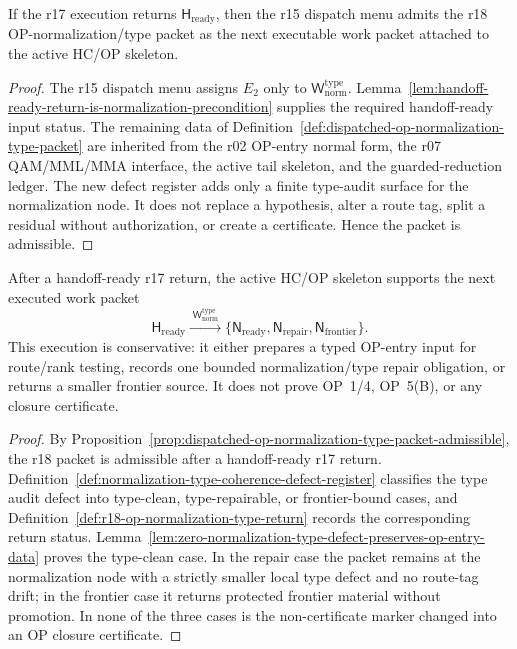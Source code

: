 \begin{proposition}
\label{prop:dispatched-op-normalization-type-packet-admissible}
If the r17 execution returns \(\mathsf H_{\mathrm{ready}}\), then the r15 dispatch menu admits the r18 OP-normalization/type packet as the next executable work packet attached to the active HC/OP skeleton.
\end{proposition}

\begin{proof}
The r15 dispatch menu assigns \(E_2\) only to \(\mathsf W_{\mathrm{norm}}^{\mathrm{type}}\).  Lemma~\ref{lem:handoff-ready-return-is-normalization-precondition} supplies the required handoff-ready input status.  The remaining data of Definition~\ref{def:dispatched-op-normalization-type-packet} are inherited from the r02 OP-entry normal form, the r07 QAM/MML/MMA interface, the active tail skeleton, and the guarded-reduction ledger.  The new defect register adds only a finite type-audit surface for the normalization node.  It does not replace a hypothesis, alter a route tag, split a residual without authorization, or create a certificate.  Hence the packet is admissible.
\end{proof}

\begin{theorem}
\label{thm:first-dispatched-op-normalization-type-packet}
After a handoff-ready r17 return, the active HC/OP skeleton supports the next executed work packet
\[
  \mathsf H_{\mathrm{ready}}
  \xrightarrow{\;\mathsf W_{\mathrm{norm}}^{\mathrm{type}}\;}
  \{\mathsf N_{\mathrm{ready}},\mathsf N_{\mathrm{repair}},\mathsf N_{\mathrm{frontier}}\}.
\]
This execution is conservative: it either prepares a typed OP-entry input for route/rank testing, records one bounded normalization/type repair obligation, or returns a smaller frontier source.  It does not prove OP~1/4, OP~5(B), or any closure certificate.
\end{theorem}

\begin{proof}
By Proposition~\ref{prop:dispatched-op-normalization-type-packet-admissible}, the r18 packet is admissible after a handoff-ready r17 return.  Definition~\ref{def:normalization-type-coherence-defect-register} classifies the type audit defect into type-clean, type-repairable, or frontier-bound cases, and Definition~\ref{def:r18-op-normalization-type-return} records the corresponding return status.  Lemma~\ref{lem:zero-normalization-type-defect-preserves-op-entry-data} proves the type-clean case.  In the repair case the packet remains at the normalization node with a strictly smaller local type defect and no route-tag drift; in the frontier case it returns protected frontier material without promotion.  In none of the three cases is the non-certificate marker changed into an OP closure certificate.
\end{proof}

